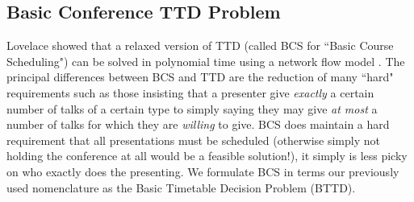 \documentclass{svjour3}                     %
\begin{document}
\subsection{Basic Conference TTD Problem}
Lovelace showed that a relaxed version of TTD (called BCS for ``Basic Course Scheduling") can be solved in polynomial time using a network flow model \cite{lovelace2010}. The principal differences between BCS and TTD are the reduction of many ``hard" requirements such as those insisting that a presenter give \emph{exactly} a certain number of talks of a certain type to simply saying they may give \emph{at most} a number of talks for which they are \emph{willing} to give. BCS does maintain a hard requirement that all presentations must be scheduled (otherwise simply not holding the conference at all would be a feasible solution!), it simply is less picky on who exactly does the presenting. We formulate BCS in terms our previously used nomenclature as the Basic Timetable Decision Problem (BTTD).
\end{document}
